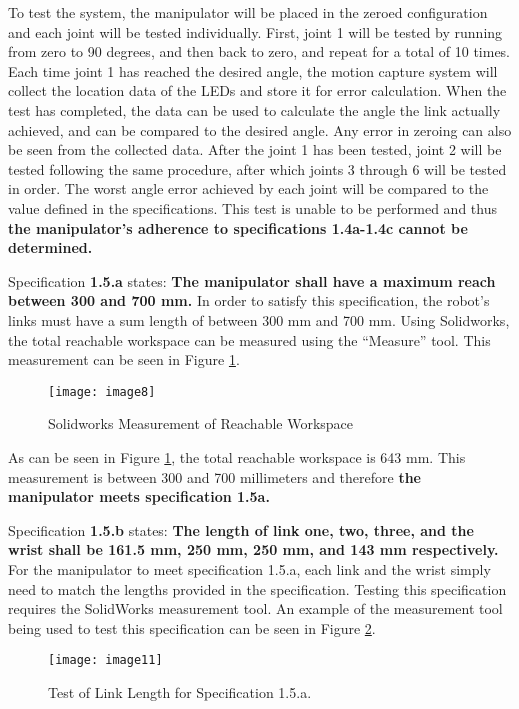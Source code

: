 To test the system, the manipulator will be placed in the zeroed configuration and each joint will be tested individually. First, joint 1 will be tested by running from zero to 90 degrees, and then back to zero, and repeat for a total of 10 times. Each time joint 1 has reached the desired angle, the motion capture system will collect the location data of the LEDs and store it for error calculation. When the test has completed, the data can be used to calculate the angle the link actually achieved, and can be compared to the desired angle. Any error in zeroing can also be seen from the collected data. After the joint 1 has been tested, joint 2 will be tested following the same procedure, after which joints 3 through 6 will be tested in order. The worst angle error achieved by each joint will be compared to the value defined in the specifications. This test is unable to be performed and thus \textbf{the manipulator’s adherence to specifications 1.4a-1.4c cannot be determined.}


Specification \textbf{1.5.a} states: \textbf{The manipulator shall have a maximum reach between 300 and 700 mm.} In order to satisfy this specification, the robot’s links must have a sum length of between 300 mm and 700 mm. Using Solidworks, the total reachable workspace can be measured using the “Measure” tool. This measurement can be seen in Figure \ref{fig:meas}.

\begin{figure}[htp]
  \centering
  \texttt{[image: image8]}
  \caption{Solidworks Measurement of Reachable Workspace}
  \label{fig:meas}
\end{figure}

As can be seen in Figure \ref{fig:meas}, the total reachable workspace is 643 mm. This measurement is between 300 and 700 millimeters and therefore \textbf{the manipulator meets specification 1.5a.}

Specification \textbf{1.5.b} states: \textbf{The length of link one, two, three, and the wrist shall be 161.5 mm, 250 mm, 250 mm, and 143 mm respectively.} For the manipulator to meet specification 1.5.a, each link and the wrist simply need to match the lengths provided in the specification. Testing this specification requires the SolidWorks measurement tool. An example of the measurement tool being used to test this specification can be seen in Figure \ref{fig:llength}.

\begin{figure}[htp]
  \centering
  \texttt{[image: image11]}
  \caption{Test of Link Length for Specification 1.5.a.}
  \label{fig:llength}
\end{figure}

